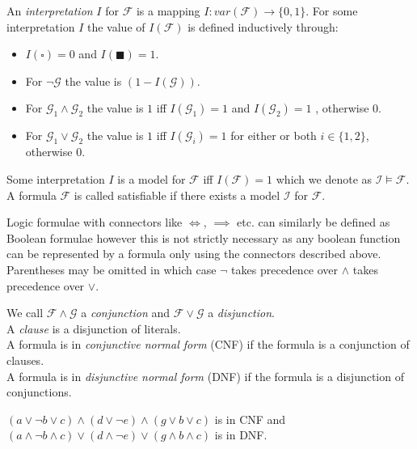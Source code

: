 \begin{definition}
An \textit{interpretation} $I$ for $\mathcal{F}$ is a mapping $I\colon var(\mathcal{F}) \to \{0,1\}$.
For some interpretation $I$ the value of $I(\mathcal{F})$ is defined inductively through:
\begin{itemize}
    \item $I\left(\square\right)=0$ and $I\left(\blacksquare\right)=1$.
    \item For $\neg\mathcal{G}$ the value is $\left(1-I(\mathcal{G})\right)$.
    \item For $\mathcal{G}_1 \land \mathcal{G}_2$ the value is $1$ iff $I(\mathcal{G}_1)=1$ and $I(\mathcal{G}_2)=1$ , otherwise $0$.
    \item For $\mathcal{G}_1 \lor \mathcal{G}_2$ the value is $1$ iff $I(\mathcal{G}_i)=1$ for either or both $i\in\{1,2\}$, otherwise $0$.
\end{itemize}

Some interpretation $I$ is a model for $\mathcal{F}$ iff $I(\mathcal{F})=1$ which we denote as $\mathcal{I}\vDash\mathcal{F}$.\\
A formula $\mathcal{F}$ is called satisfiable if there exists a model $\mathcal{I}$ for $\mathcal{F}$.
\end{definition}

Logic formulae with connectors like $\iff$, $\implies$ etc. can similarly be defined as Boolean formulae however this is not strictly necessary as any boolean function can be represented by a formula only using the connectors described above. Parentheses may be omitted in which case $\neg$ takes precedence over $\land$ takes precedence over $\lor$.

\begin{definition}
We call $\mathcal{F}\land\mathcal{G}$  a \textit{conjunction} and $\mathcal{F}\lor\mathcal{G}$ a \textit{disjunction}.\\
A \textit{clause} is a disjunction of literals.\\
A formula is in \textit{conjunctive normal form} (CNF) if the formula is a conjunction of clauses.\\
A formula is in \textit{disjunctive normal form} (DNF) if the formula is a disjunction of conjunctions.
\end{definition}
\begin{example}
$\left(a \lor \neg b \lor c\right)\land\left(d \lor \neg e\right)\land\left(g \lor b \lor c\right)$ is in CNF and\\
$\left(a \land \neg b \land c\right)\lor\left(d \land \neg e\right)\lor\left(g \land b \land c\right)$ is in DNF.\\
\end{example}



